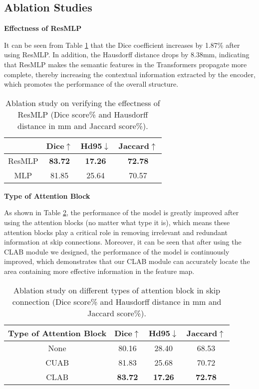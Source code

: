 \documentclass[runningheads]{llncs}
\begin{document}
\subsection{Ablation Studies}
\label{sec4.4}
\noindent\textbf{Effectness of ResMLP}\par
It can be seen from Table \ref{table4} that the Dice coefficient increases by 1.87\% after using ResMLP. In addition, the Hausdorff distance drops by 8.38mm, indicating that ResMLP makes the semantic features in the Transformers propagate more complete, thereby increasing the contextual information extracted by the encoder, which promotes the performance of the overall structure.
\begin{table}[H]\centering
\caption{ Ablation study on verifying the effectness of ResMLP (Dice score\% and Hausdorff distance in mm and Jaccard score\%).}
\label{table4}
\begin{tabular}{c|c|c|c}
\hline
    & Dice$\uparrow$           & Hd95$\downarrow$           & Jaccard$\uparrow$        \\ \hline
ResMLP & \textbf{83.72} & \textbf{17.26} & \textbf{72.78} \\
MLP   & 81.85          & 25.64          & 70.57         \\ \hline
\end{tabular}
\end{table}

\noindent\textbf{Type of Attention Block}\par
As shown in Table \ref{table5}, the performance of the model is greatly improved after using the attention blocks (no matter what type it is), which means these attention blocks play a critical role in removing irrelevant and redundant information at skip connections. Moreover, it can be seen that after using the CLAB module we designed, the performance of the model is continuously improved, which demonstrates that our CLAB module can accurately locate the area containing more effective information in the feature map.
\begin{table}[H]\centering
\caption{Ablation study on different types of attention block in skip connection (Dice score\% and Hausdorff distance in mm and Jaccard score\%).}
\label{table5}
\begin{tabular}{c|c|c|c}
\hline
    Type of Attention Block & Dice$\uparrow$           & Hd95$\downarrow$           & Jaccard$\uparrow$        \\ \hline
    None                    & 80.16          & 28.40          & 68.53          \\
    CUAB\cite{wang2021cuab}                    & 81.83          & 25.68          & 70.72          \\
    CLAB                    & \textbf{83.72} & \textbf{17.26} & \textbf{72.78} \\ \hline
    \end{tabular}
\end{table}
\end{document}
